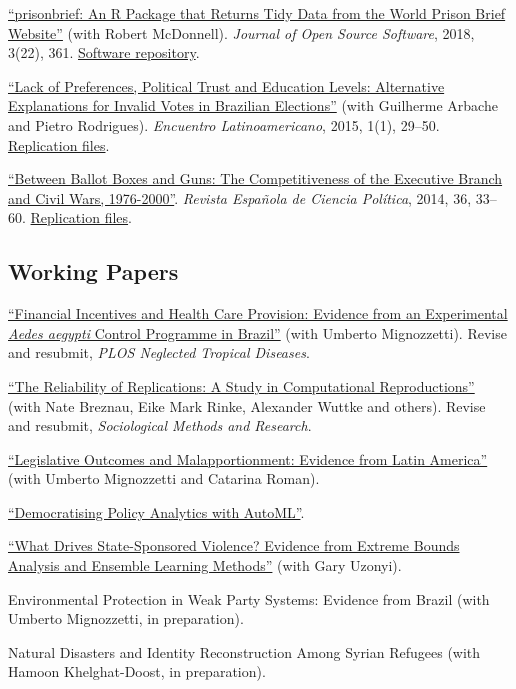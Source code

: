 \documentclass[a4paper]{article}
\renewenvironment{itemize}{
	\begin{list}{}{
			\setlength{\leftmargin}{1.5em}
		}
		}{
	\end{list}
}
\begin{document}
\begin{itemize}
\item \href{https://doi.org/10.21105/joss.00361}{``prisonbrief: An R Package that Returns Tidy Data from the World Prison Brief Website''} (with Robert McDonnell). \textit{Journal of Open Source Software}, 2018, 3(22), 361. \href{https://github.com/danilofreire/prisonbrief}{Software repository}.
\item \href{http://www.iapss.org/wp-content/uploads/2014/10/ELA1.1_2.Lack-of-Preferences-Political-Trust-and-Education-Levels.pdf}{``Lack of Preferences, Political Trust and Education Levels: Alternative Explanations for Invalid Votes in Brazilian Elections''} (with Guilherme Arbache and Pietro Rodrigues). \textit{Encuentro Latinoamericano}, 2015, 1(1), 29--50. \href{https://github.com/danilofreire/invalid-votes-brazil}{Replication files}.
\item \href{http://recyt.fecyt.es/index.php/recp/article/view/37638}{``Between Ballot Boxes and Guns: The Competitiveness of the Executive Branch and Civil Wars, 1976-2000''}. \textit{Revista Española de Ciencia Política}, 2014, 36, 33--60. \href{https://doi.org/10.7910/DVN/NSDUYG}{Replication files}.
\end{itemize}

\subsection*{Working Papers}

\begin{itemize}
\item \href{https://github.com/danilofreire/incentives-healthcare}{``Financial Incentives and Health Care Provision: Evidence from an Experimental \textit{Aedes aegypti} Control Programme in Brazil''} (with Umberto Mignozzetti). Revise and resubmit, \textit{PLOS Neglected Tropical Diseases}.
\item \href{https://osf.io/preprints/socarxiv/j7qta}{``The Reliability of Replications: A Study in Computational
Reproductions''} (with Nate Breznau, Eike Mark Rinke, Alexander Wuttke and others). Revise and resubmit, \textit{Sociological Methods and Research}.
\item \href{https://github.com/danilofreire/danilofreire.github.io/blob/master/malapportionment.pdf}{``Legislative Outcomes and Malapportionment: Evidence from Latin America''} (with Umberto Mignozzetti and Catarina Roman).
\item \href{https://github.com/danilofreire/mercatus-analytics-papers/blob/main/automl-paper/automl.pdf}{``Democratising Policy Analytics with AutoML''}.
\item \href{https://osf.io/pzx3q}{``What Drives State-Sponsored Violence? Evidence from Extreme Bounds Analysis and Ensemble Learning Methods''} (with Gary Uzonyi).
\item Environmental Protection in Weak Party Systems: Evidence from Brazil (with Umberto Mignozzetti, in preparation).
\item Natural Disasters and Identity Reconstruction Among Syrian Refugees (with Hamoon Khelghat-Doost, in preparation).
\end{itemize}
\end{document}
